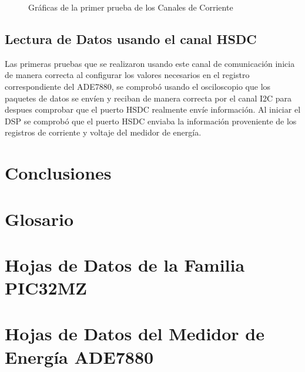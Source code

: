\documentclass[letterpaper,12pt,oneside]{book}
\begin{document}
\begin{figure}[!htbp]
{			}
			\caption[Gráficas de la primer prueba de los Canales de Corriente]{Gráficas de la primer prueba de los Canales de Corriente}
			\label{CanalCorriente}
		\end{figure}

		\section{Lectura de Datos usando el canal HSDC}
		Las primeras pruebas que se realizaron usando este canal de comunicación inicia de manera correcta al configurar los valores necesarios en el registro correspondiente del ADE7880, se comprobó usando el osciloscopio que los paquetes de datos se envíen y reciban de manera correcta por el canal I2C para despues comprobar que el puerto HSDC realmente envíe información.
		Al iniciar el DSP se comprobó que el puerto HSDC enviaba la información proveniente de los registros de corriente y voltaje del medidor de energía.
	
	\chapter{Conclusiones}
	\chapter{Glosario}
	
	
	
	
	\appendix
	\chapter{Hojas de Datos de la Familia PIC32MZ}
		

	\chapter{Hojas de Datos del Medidor de Energía ADE7880}
		

	\backmatter%
\end{document}
